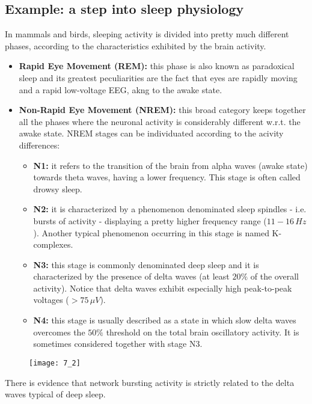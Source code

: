 \subsection{Example: a step into sleep physiology}
In mammals and birds, sleeping activity is divided into pretty much different
phases, according to the characteristics exhibited by the brain activity.
\begin{itemize}
    \item \textbf{Rapid Eye Movement (REM):} this phase is also known as paradoxical
    sleep and its greatest peculiarities are the fact that eyes are rapidly moving
    and a rapid low-voltage EEG, akng to the awake state.
    \item \textbf{Non-Rapid Eye Movement (NREM):} this broad category keeps together
    all the phases where the neuronal activity is considerably different w.r.t. the
    awake state. NREM stages can be individuated according to the acivity differences:
    \begin{itemize}
        \item \textbf{N1:} it refers to the transition of the brain from alpha waves
        (awake state) towards theta waves, having a lower frequency. This stage is
        often called drowsy sleep.
        \item \textbf{N2:} it is characterized by a phenomenon denominated sleep
        spindles - i.e. bursts of activity - displaying a pretty higher frequency range
        (\(11-16\,Hz\)). Another typical phenomenon occurring in this stage is named
        K-complexes.
        \item \textbf{N3:} this stage is commonly denominated deep sleep and it is
        characterized by the presence of delta waves (at least \(20\%\) of the
        overall activity). Notice that delta waves exhibit especially high
        peak-to-peak voltages (\(>75\,\mu{V}\)).
        \item \textbf{N4:} this stage is usually described as a state in which slow
        delta waves overcomes the \(50\%\) threshold on the total brain oscillatory
        activity. It is sometimes considered together with stage N3.
    \end{itemize}
\end{itemize}
\begin{figure}[H]
    \texttt{[image: 7\_2]}
    \centering
\end{figure}
There is evidence that network bursting activity is strictly related to the delta
waves typical of deep sleep.

